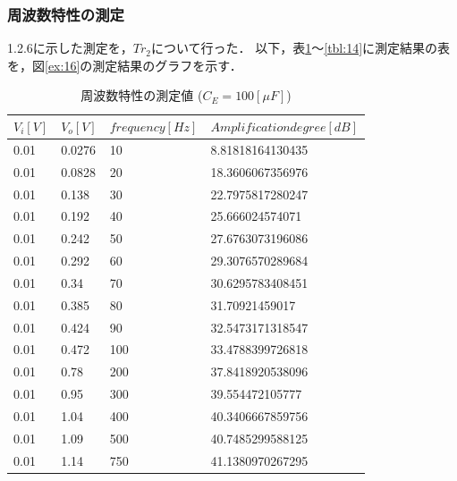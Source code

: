 \documentclass[10pt, a4j, dvipdfmx]{jarticle}
\begin{document}
    \subsubsection{周波数特性の測定}
    1.2.6に示した測定を，$Tr_2$について行った．
    以下，表\ref{tbl:12}〜\ref{tbl:14}に測定結果の表を，図\ref{ex:16}の測定結果のグラフを示す．
    \begin{table}[H]
        \centering
        \caption{周波数特性の測定値 ($C_E = 100[\mu F]$)}
        \label{tbl:12}
        \small
        \begin{tabular}{|l|l|l|l|}
        \hline
        $V_i[V]$ & $V_o[V]$ & $frequency[Hz]$ & $Amplification degree[dB]$ \\ \hline
        0.01     & 0.0276   & 10              & 8.81818164130435           \\ \hline
        0.01     & 0.0828   & 20              & 18.3606067356976           \\ \hline
        0.01     & 0.138    & 30              & 22.7975817280247           \\ \hline
        0.01     & 0.192    & 40              & 25.666024574071            \\ \hline
        0.01     & 0.242    & 50              & 27.6763073196086           \\ \hline
        0.01     & 0.292    & 60              & 29.3076570289684           \\ \hline
        0.01     & 0.34     & 70              & 30.6295783408451           \\ \hline
        0.01     & 0.385    & 80              & 31.70921459017             \\ \hline
        0.01     & 0.424    & 90              & 32.5473171318547           \\ \hline
        0.01     & 0.472    & 100             & 33.4788399726818           \\ \hline
        0.01     & 0.78     & 200             & 37.8418920538096           \\ \hline
        0.01     & 0.95     & 300             & 39.554472105777            \\ \hline
        0.01     & 1.04     & 400             & 40.3406667859756           \\ \hline
        0.01     & 1.09     & 500             & 40.7485299588125           \\ \hline
        0.01     & 1.14     & 750             & 41.1380970267295           \\ \hline

\end{tabular}
\end{table}
\end{document}
